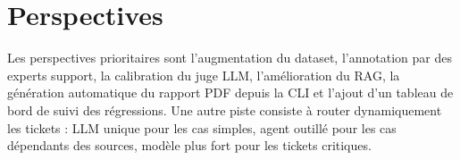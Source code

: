 \section{Perspectives}

Les perspectives prioritaires sont l'augmentation du dataset, l'annotation par
des experts support, la calibration du juge LLM, l'amélioration du RAG, la
génération automatique du rapport PDF depuis la CLI et l'ajout d'un tableau de
bord de suivi des régressions. Une autre piste consiste à router dynamiquement
les tickets : LLM unique pour les cas simples, agent outillé pour les cas
dépendants des sources, modèle plus fort pour les tickets critiques.

